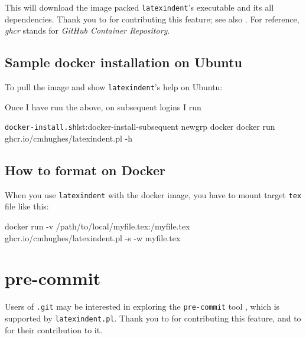   This will download the image packed \texttt{latexindent}'s executable and its all
  dependencies.  Thank you to \cite{eggplants} for contributing this
  feature; see also \cite{cmhughesio}. For reference, \emph{ghcr} stands for \emph{GitHub
  Container Repository}.

 \subsection{Sample docker installation on Ubuntu}
  To pull the image and show \texttt{latexindent}'s help on Ubuntu:


  Once I have run the above, on subsequent logins I run
  \begin{cmhlistings}[style=tcblatex,language=Bash]{\texttt{docker-install.sh}}{lst:docker-install-subsequent}
newgrp docker
docker run ghcr.io/cmhughes/latexindent.pl -h
\end{cmhlistings}

 \subsection{How to format on Docker}
  When you use \texttt{latexindent} with the docker image, you have to mount target \texttt{tex} file like this:

  \begin{commandshell}
docker run -v /path/to/local/myfile.tex:/myfile.tex ghcr.io/cmhughes/latexindent.pl -s -w myfile.tex
\end{commandshell}

 \section{pre-commit}

  Users of \texttt{.git} may be interested  in exploring the \texttt{pre-commit} tool \cite{pre-commithome}, which
  is supported by \texttt{latexindent.pl}. Thank you to \cite{tdegeusprecommit} for
  contributing this feature, and to \cite{holzhausprecommit} for their contribution to
  it.

